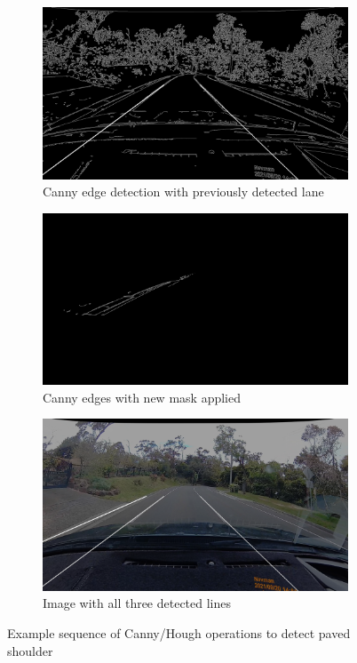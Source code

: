 \documentclass[11pt,twoside]{report}
\begin{document}
\begin{figure}[h]
\centering
\begin{subfigure}{0.3\textwidth}
	\includegraphics[width=\textwidth]{f010_canny_super.png}
	\caption{Canny edge detection with previously detected lane}
\end{subfigure}
\hfill
\begin{subfigure}{0.3\textwidth}
	\includegraphics[width=\textwidth]{f010_canny_mask.png}
	\caption{Canny edges with new mask applied}
\end{subfigure}
\hfill
\begin{subfigure}{0.3\textwidth}
	\includegraphics[width=\textwidth]{f010_three_lines.png}
	\caption{Image with all three detected lines}
\end{subfigure}
\caption{Example sequence of Canny/Hough operations to detect paved shoulder}
\label{fig:010}
\end{figure}
\end{document}

